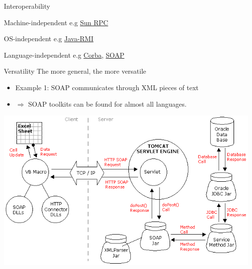 \documentclass[bigger,hyperref={colorlinks=true, urlcolor=red, plainpages=false, pdfpagelabels, bookmarksnumbered}]{beamer}
\begin{document}
\begin{frame}[label=sec-1-7]{Interoperability}
\begin{block}{Machine-independent}
e.g \href{http://www.ietf.org/rfc/rfc1057.txt}{Sun RPC} 
\vspace{5mm}
\end{block}
\begin{block}{OS-independent}
e.g \href{http://www.oracle.com/technetwork/java/javase/tech/index-jsp-136424.html}{Java-RMI}
\vspace{5mm}
\end{block}
\begin{block}{Language-independent}
e.g \href{http://www.corba.org}{Corba}, \href{http://www.w3.org/TR/soap/}{SOAP}
\end{block}
\end{frame}
\begin{frame}[label=sec-1-8]{Versatility}
The more general, the more versatile 
\begin{itemize}
\item Example 1: SOAP communicates through XML pieces of text
\item $\Rightarrow$ SOAP toolkits can be found for almost all languages.
\end{itemize}
\includegraphics[width=.9\linewidth]{../soap-img/soapuser-archi1.png}
\end{frame}
\end{document}

